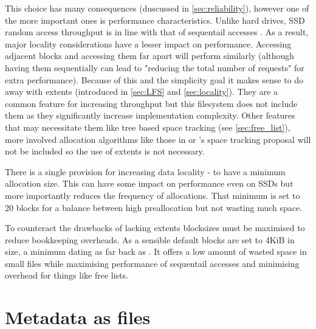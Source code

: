         This choice has many consequences (duscussed in \autoref{sec:reliability}),
        however one of the more important ones is performance characteristics.
        Unlike hard drives, SSD random access throughput is in line with that
        of sequentail accesses \cite{servethehome_review}. As a result, major
        locality considerations have a lesser impact on performance. Accessing
        adjacent blocks and accessing them far apart will perform similarly
        (although having them sequentially can lead to "reducing the total
        number of requests" \cite{ext4_docs} for extra performance). Because of
        this and the simplicity goal it makes sense to do away with extents
        (introduced in \autoref{sec:LFS} and \autoref{sec:locality}). They are a common
        feature for increasing throughput but this filesystem does not include
        them as they significantly increase implementation complexity. Other
        features that may necessitate them like tree based space tracking (see
        \autoref{sec:free_list}), more involved allocation algorithms like those in
         or \citeauthor{ext4_space_maps}'s space tracking
        proposal will not be included so the use of extents is not necessary.

        There is a single provision for increasing data locality - to have a
        minimum allocation size. This can have some impact on performance even
        on SSDs but more importantly reduces the frequency of allocations. That
        minimum is set to 20 blocks for a balance between high preallocation
        but not wasting much space.

        To counteract the drawbacks of lacking extents blocksizes must be
        maximised to reduce bookkeeping overheads. As a sensible default blocks
        are set to 4KiB in size, a minimum dating as far back as 
        . It offers a low amount of wasted space in small files
        while maximising performance of sequentail accesses and minimising
        overhead for things like free lists.

    \section{Metadata as files}
        \label{sec:files}


